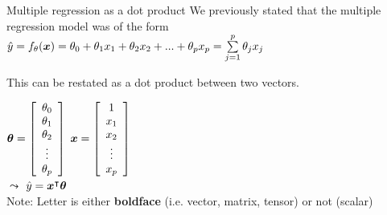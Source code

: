 \documentclass[aspectratio=169]{../latex_main/tntbeamer}  %
\begin{document}
	
	\begin{frame}{Multiple regression as a dot product}
	   We previously stated that the multiple regression model was of the form\\
        \hspace{3cm}
	    $\hat{y} = f_\theta (\bm{x}) = \theta_0 + \theta_1x_1 + \theta_2x_2 + ... + \theta_px_p = \sum\limits_{j=1}^p\theta_jx_j$ 
	   
	   This can be restated as a dot product between two vectors.

	   	$\bm{\theta} = \left[\begin{array}{c}
	          \theta_0\\
	          \theta_1 \\
	          \theta_2 \\
	          \vdots\\
	          \theta_p
	    \end{array}\right]$	       
	    $\bm{x} = \left[\begin{array}{c}
	          1\\
	          x_1 \\
	          x_2 \\
	          \vdots\\
	          x_p
	    \end{array}\right]$	\\
	    \bigskip
	    $\leadsto$ $\hat{y} = \bm{x}^\intercal\bm{\theta}$\\[2em]
	    
	    \alert{Note}: Letter is either \textbf{boldface} (i.e. vector, matrix, tensor) or not (scalar)
	    
	\end{frame}
	
\end{document}
